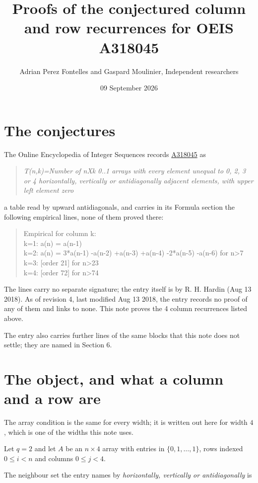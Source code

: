\documentclass[11pt]{article}
\title{Proofs of the conjectured column and row recurrences for OEIS A318045}
\author{Adrian Perez Fontelles and Gaspard Moulinier, Independent researchers}
\date{09 September 2026}
\theoremstyle{definition}
\begin{document}
\maketitle
\section{The conjectures}

The Online Encyclopedia of Integer Sequences records \href{https://oeis.org/A318045}{A318045} as

\begin{quote}\itshape T(n,k)=Number of nXk 0..1 arrays with every element unequal to 0, 2, 3 or 4 horizontally, vertically or antidiagonally adjacent elements, with upper left element zero\end{quote}

a table read by upward antidiagonals, and carries in its Formula section the following empirical lines, none of them proved there:

\begin{quote}\ttfamily Empirical for column k:\\
k=1: a(n) = a(n-1)\\k=2: a(n) = 3*a(n-1) -a(n-2) +a(n-3) +a(n-4) -2*a(n-5) -a(n-6) for n>7\\k=3: [order 21] for n>23\\k=4: [order 72] for n>74\end{quote}

The lines carry no separate signature; the entry itself is by R. H. Hardin (Aug 13 2018). As of revision 4, last modified Aug 13 2018, the entry records no proof of any of them and links to none. This note proves the 4 column recurrences listed above.

The entry also carries further lines of the same blocks that this note does not settle; they are named in Section 6.

\section{The object, and what a column and a row are}

The array condition is the same for every width; it is written out here for width $4$, which is one of the widths this note uses.

Let $q = 2$ and let $A$ be an $n \times 4$ array with entries in $\{0,1,\dots,1\}$, rows indexed $0 \le i < n$ and columns $0 \le j < 4$.

The neighbour set the entry names by {\itshape horizontally, vertically or antidiagonally} is
\end{document}
